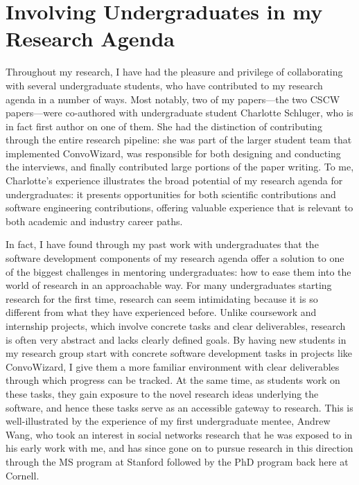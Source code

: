 \documentclass[12pt,letterpaper]{article}
\begin{document}
\section{Involving Undergraduates in my Research Agenda}
Throughout my research, I have had the pleasure and privilege of collaborating with several undergraduate students, who have contributed to my research agenda in a number of ways.
Most notably, two of my papers---the two CSCW papers---were co-authored with undergraduate student Charlotte Schluger, who is in fact first author on one of them.
She had the distinction of contributing through the entire research pipeline: she was part of the larger student team that implemented ConvoWizard, was responsible for both designing and conducting the interviews, and finally contributed large portions of the paper writing.
To me, Charlotte's experience illustrates the broad potential of my research agenda for undergraduates: it presents opportunities for both scientific contributions and software engineering contributions, offering valuable experience that is relevant to both academic and industry career paths.

In fact, I have found through my past work with undergraduates that the software development components of my research agenda offer a solution to one of the biggest challenges in mentoring undergraduates: how to ease them into the world of research in an approachable way.
For many undergraduates starting research for the first time, research can seem intimidating because it is so different from what they have experienced before.
Unlike coursework and internship projects, which involve concrete tasks and clear deliverables, research is often very abstract and lacks clearly defined goals.
By having new students in my research group start with concrete software development tasks in projects like ConvoWizard, I give them a more familiar environment with clear deliverables through which progress can be tracked.
At the same time, as students work on these tasks, they gain exposure to the novel research ideas underlying the software, and hence these tasks serve as an accessible gateway to research.
This is well-illustrated by the experience of my first undergraduate mentee, Andrew Wang, who took an interest in social networks research that he was exposed to in his early work with me, and has since gone on to pursue research in this direction through the MS program at Stanford followed by the PhD program back here at Cornell.
\end{document}
